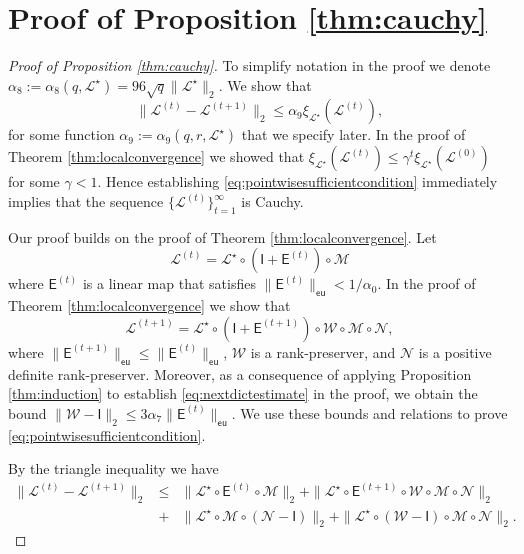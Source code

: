 \documentclass[11pt,letterpaper]{article}
\newcommand{\sfe}{\mathsf{E}}
\newcommand{\sfi}{\mathsf{I}}
\newcommand{\eu}{\mathsf{eu}}
\begin{document}
\section{Proof of Proposition \ref{thm:cauchy}} \label{apx:cauchy}

\begin{proof}[Proof of Proposition \ref{thm:cauchy}]
	To simplify notation in the proof we denote $\alpha_8:=\alpha_8(q,\mathcal{L}^{\star}) = 96 \sqrt{q} \|\mathcal{L}^{\star}\|_{2} $.  We show that
	\begin{equation} \label{eq:pointwisesufficientcondition}
		\| \mathcal{L}^{(t)} - \mathcal{L}^{(t+1)} \|_2 \leq \alpha_{9} \xi_{\mathcal{L}^{\star}}(\mathcal{L}^{(t)}),
	\end{equation}
	for some function $\alpha_9:=\alpha_9(q,r,\mathcal{L}^{\star})$ that we specify later.  In the proof of Theorem \ref{thm:localconvergence} we showed that $\xi_{\mathcal{L}^{\star}}(\mathcal{L}^{(t)}) \leq \gamma^{t} \xi_{\mathcal{L}^{\star}}(\mathcal{L}^{(0)})$ for some $\gamma<1$.  Hence establishing \eqref{eq:pointwisesufficientcondition} immediately implies that the sequence $\{\mathcal{L}^{(t)} \}_{t=1}^{\infty}$ is Cauchy.
	
	Our proof builds on the proof of Theorem \ref{thm:localconvergence}.  Let
	\begin{equation*}
		\mathcal{L}^{(t)} = \mathcal{L}^{\star} \circ (\sfi + \sfe^{(t)}) \circ \mathcal{M}
	\end{equation*}
	where $\sfe^{(t)}$ is a linear map that satisfies $\|\sfe^{(t)}\|_{\eu} < 1/\alpha_0$.  In the proof of Theorem \ref{thm:localconvergence} we show that
	\begin{equation*}
		\mathcal{L}^{(t+1)} = \mathcal{L}^{\star} \circ (\sfi+\sfe^{(t+1)}) \circ \mathcal{W} \circ \mathcal{M} \circ \mathcal{N},
	\end{equation*}
	where $\|\sfe^{(t+1)}\|_{\eu} \leq \|\sfe^{(t)}\|_{\eu}$, $\mathcal{W}$ is a rank-preserver, and $\mathcal{N}$ is a positive definite rank-preserver.  Moreover, as a consequence of applying Proposition \ref{thm:induction} to establish \eqref{eq:nextdictestimate} in the proof, we obtain the bound $\|\mathcal{W} - \sfi\|_2 \leq 3 \alpha_7\|\sfe^{(t)}\|_{\eu}$.  We use these bounds and relations to prove \eqref{eq:pointwisesufficientcondition}.
	
	By the triangle inequality we have
	\begin{eqnarray} \label{eq:cauchytriangleineq}
		\| \mathcal{L}^{(t)} - \mathcal{L}^{(t+1)} \|_2 & \leq &  \| \mathcal{L}^{\star} \circ \sfe^{(t)} \circ \mathcal{M} \|_2 + \| \mathcal{L}^{\star} \circ \sfe^{(t+1)} \circ \mathcal{W} \circ \mathcal{M} \circ \mathcal{N} \|_2 \nonumber \\
		& + & \| \mathcal{L}^{\star}  \circ \mathcal{M} \circ (\mathcal{N} - \sfi) \|_2 + \| \mathcal{L}^{\star} \circ (\mathcal{W} - \sfi) \circ \mathcal{M} \circ \mathcal{N} \|_2.
	\end{eqnarray}
	

\end{proof}
\end{document}
